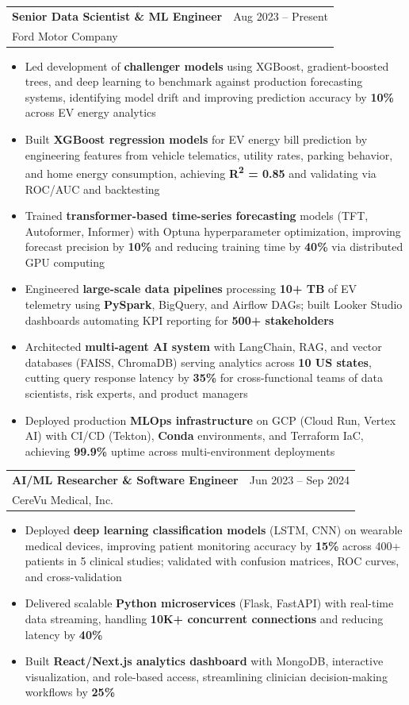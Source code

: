 \documentclass[11pt,letterpaper]{article}
\makeatletter
\newcommand{\cventry}[5]{%
  \noindent\begin{tabularx}{\textwidth}{@{}X r@{}}
    {\bfseries\color{headerblue}#2} & {\color{graytext}#1} \\
    {\color{accentcolor}#3}\enskip{\color{lightgray}#4} & \\
  \end{tabularx}%
  \vspace{0.02em}%
  #5%
  \vspace{0.15em}%
}
\makeatother
\begin{document}
\cventry{Aug 2023 -- Present}{Senior Data Scientist \& ML Engineer}{Ford Motor Company}{Detroit, MI}{
\begin{itemize}[leftmargin=0.4cm, itemsep=0.02cm, topsep=0.05cm, label={\color{goldaccent}\textbullet}]
  \item Led development of \textbf{challenger models} using XGBoost, gradient-boosted trees, and deep learning to benchmark against production forecasting systems, identifying model drift and improving prediction accuracy by \textbf{10\%} across EV energy analytics
  \item Built \textbf{XGBoost regression models} for EV energy bill prediction by engineering features from vehicle telematics, utility rates, parking behavior, and home energy consumption, achieving \textbf{R\textsuperscript{2} = 0.85} and validating via ROC/AUC and backtesting
  \item Trained \textbf{transformer-based time-series forecasting} models (TFT, Autoformer, Informer) with Optuna hyperparameter optimization, improving forecast precision by \textbf{10\%} and reducing training time by \textbf{40\%} via distributed GPU computing
  \item Engineered \textbf{large-scale data pipelines} processing \textbf{10+ TB} of EV telemetry using \textbf{PySpark}, BigQuery, and Airflow DAGs; built Looker Studio dashboards automating KPI reporting for \textbf{500+ stakeholders}
  \item Architected \textbf{multi-agent AI system} with LangChain, RAG, and vector databases (FAISS, ChromaDB) serving analytics across \textbf{10 US states}, cutting query response latency by \textbf{35\%} for cross-functional teams of data scientists, risk experts, and product managers
  \item Deployed production \textbf{MLOps infrastructure} on GCP (Cloud Run, Vertex AI) with CI/CD (Tekton), \textbf{Conda} environments, and Terraform IaC, achieving \textbf{99.9\%} uptime across multi-environment deployments
\end{itemize}
}

\cventry{Jun 2023 -- Sep 2024}{AI/ML Researcher \& Software Engineer}{CereVu Medical, Inc.}{San Francisco Bay Area, CA}{
\begin{itemize}[leftmargin=0.4cm, itemsep=0.02cm, topsep=0.05cm, label={\color{goldaccent}\textbullet}]
  \item Deployed \textbf{deep learning classification models} (LSTM, CNN) on wearable medical devices, improving patient monitoring accuracy by \textbf{15\%} across 400+ patients in 5 clinical studies; validated with confusion matrices, ROC curves, and cross-validation
  \item Delivered scalable \textbf{Python microservices} (Flask, FastAPI) with real-time data streaming, handling \textbf{10K+ concurrent connections} and reducing latency by \textbf{40\%}
  \item Built \textbf{React/Next.js analytics dashboard} with MongoDB, interactive visualization, and role-based access, streamlining clinician decision-making workflows by \textbf{25\%}
\end{itemize}
}
\end{document}
